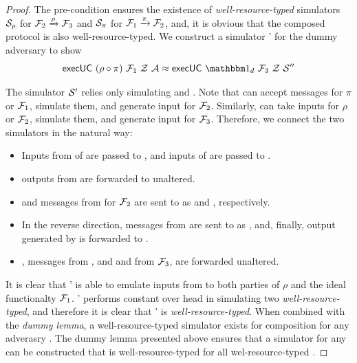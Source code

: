 \begin{proof}
The pre-condition ensures the existence of \textit{well-resource-typed} simulators $\mathcal{S}_\rho$ for $\mathcal{F}_2 \xrightarrow{\rho} \mathcal{F}_3$ and $\mathcal{S}_\pi$ for $\mathcal{F}_1 \xrightarrow{\pi} \mathcal{F}_2$, and, it is obvious that the composed protocol is also well-resource-typed.
We construct a simulator \Sim' for the dummy adversary to show
\[
	\msf{execUC}\ (\rho \circ \pi)\ \F_1\ \Z\ \A \approx \msf{execUC}\ \idealP\ \F_3\ \Z\ \Sim''
\]	

The simulator $\mathcal{S}'$ relies only simulating \SIM{\pi} and \SIM{\rho}.
Note that \SIM{\pi} can accept messages for $\pi$ or $\mathcal{F}_1$, simulate them, and generate input for $\mathcal{F}_2$. 
Similarly, \SIM{\rho} can take inputs for $\rho$ or $\mathcal{F}_2$, simulate them, and generate input for $\mathcal{F}_3$.
Therefore, we connect the two simulators in the natural way:
\begin{itemize}
\item Inputs from \Z of  are passed to \SIM{\rho}, and inputs of  are passed to \SIM{\pi}.  
\item {} outputs from \SIM{\rho} are forwarded to \Z unaltered.
\item {} and  messages from \SIM{\pi} for $\mathcal{F}_2$ are sent to \SIM{\rho} as  and , respectively. 
\item In the reverse direction,  messages from \SIM{\rho} are sent to \SIM{\pi} as , and, finally,  output generated by \SIM{\pi} is forwarded to \Z.
\item {},  messages from \SIM{\rho}, and  and  from $\mathcal{F}_3$, are forwarded unaltered. 
\end{itemize}
It is clear that \Sim' is able to emulate inputs from \Z to both parties of $\rho$ and the ideal functionalty $\mathcal{F}_1$.
\Sim' performs constant over head in simulating two \emph{well-resource-typed}, and therefore it is clear that \Sim' is \emph{well-resource-typed}.
When combined with the \emph{dummy lemma}, a well-resource-typed simulator exists for composition for any adverasry \A. 
The dummy lemma presented above ensures that a simulator for any \A can be constructed that is well-resource-typed for all wel-resource-typed \A.
\end{proof}

